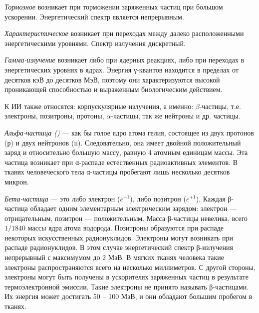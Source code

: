 \documentclass[14pt,a4paper]{article}
\begin{document}
\emph{Тормозное} возникает при торможении заряженных частиц при большом
ускорении. Энергетический спектр является непрерывным.

\emph{Характеристическое} возникает при переходах между далеко расположенными
энергетическими уровнями. Спектр излучения дискретный.


\emph{Гамма-излучение} возникает либо при ядерных реакциях, либо при переходах в
энергетических уровнях в ядрах. Энергия
γ-квантов находится в пределах от десятков кэВ до десятков МэВ, поэтому они характеризуются высокой проникающей способностью и выраженным биологическим действием.

К ИИ также относятся: корпускулярные излучения, а именно: $\beta$-частицы, т.е. электроны, позитроны, протоны, $\alpha$-частицы, так же нейтроны и др. частицы.

\emph{Альфа-частица ()} — как бы голое ядро атома гелия, состоящее из
двух протонов (р) и двух нейтронов (n). Следовательно, она имеет двойной
положительный заряд и относительно большую массу, равную 4 атомным
единицам массы. Эта частица возникает при α-распаде естественных радиоактивных элементов. В тканях человеческого тела α-частицы пробегают
лишь несколько десятков микрон.

\emph{Бета-частица} — это либо электрон ($e^{-1}$), либо позитрон ($e^{+1}$). Каждая
β-частица обладает одним элементарным электрическим зарядом: электрон — отрицательным, позитрон — положительным. Масса β-частицы невелика, всего $1/1840$ массы ядра атома водорода. Позитроны образуются при распаде некоторых искусственных радионуклидов. Электроны могут возникать при распаде радионуклидов. В этом случае энергетический спектр β-излучения непрерывный с максимумом до 2 МэВ. В мягких тканях человека такие
электроны распространяются всего на несколько миллиметров. С другой
стороны, электроны могут быть получены в ускорителях заряженных частиц в результате термоэлектронной эмиссии. Такие электроны не принято называть β-частицами. Их энергия может достигать 50 -- 100 МэВ, и они обладают большим пробегом в тканях.
\end{document}
